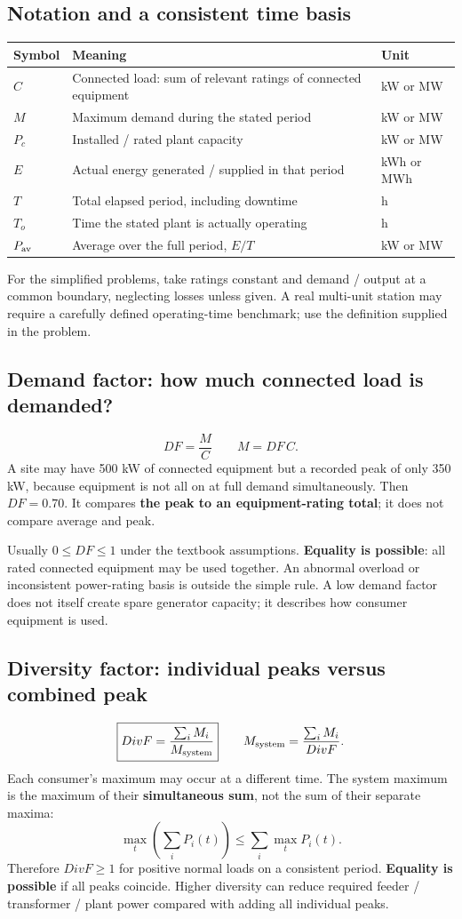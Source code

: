 \documentclass[11pt,a4paper]{article}
\begin{document}
\subsection{Notation and a consistent time basis}
\begin{center}\small
\begin{tabularx}{\textwidth}{L{2.5cm}Y L{2.5cm}}
\toprule\textbf{Symbol} & \textbf{Meaning} & \textbf{Unit}\\\midrule
$C$ & Connected load: sum of relevant ratings of connected equipment & kW or MW\\
$M$ & Maximum demand during the stated period & kW or MW\\
$P_c$ & Installed / rated plant capacity & kW or MW\\
$E$ & Actual energy generated / supplied in that period & kWh or MWh\\
$T$ & Total elapsed period, including downtime & h\\
$T_o$ & Time the stated plant is actually operating & h\\
$P_{\rm av}$ & Average over the full period, $E / T$ & kW or MW\\\bottomrule
\end{tabularx}\end{center}
For the simplified problems, take ratings constant and demand / output at a common boundary, neglecting losses unless given. A real multi-unit station may require a carefully defined operating-time benchmark; use the definition supplied in the problem.

\subsection{Demand factor: how much connected load is demanded?}
\[
\boxed{DF=\frac{M}{C}}\qquad M=DF\,C.
\]
A site may have 500 kW of connected equipment but a recorded peak of only 350 kW, because equipment is not all on at full demand simultaneously. Then $DF=0.70$. It compares \textbf{the peak to an equipment-rating total}; it does not compare average and peak.

Usually $0\le DF\le1$ under the textbook assumptions. \textbf{Equality is possible}: all rated connected equipment may be used together. An abnormal overload or inconsistent power-rating basis is outside the simple rule. A low demand factor does not itself create spare generator capacity; it describes how consumer equipment is used.

\subsection{Diversity factor: individual peaks versus combined peak}
\[
\boxed{DivF=\frac{\sum_i M_i}{M_{\rm system}}}\qquad
M_{\rm system}=\frac{\sum_i M_i}{DivF}.
\]
Each consumer's maximum may occur at a different time. The system maximum is the maximum of their \textbf{simultaneous sum}, not the sum of their separate maxima:
\[
\max_t\left(\sum_iP_i(t)\right)\le\sum_i\max_t P_i(t).
\]
Therefore $DivF\ge1$ for positive normal loads on a consistent period. \textbf{Equality is possible} if all peaks coincide. Higher diversity can reduce required feeder / transformer / plant power compared with adding all individual peaks.
\end{document}
